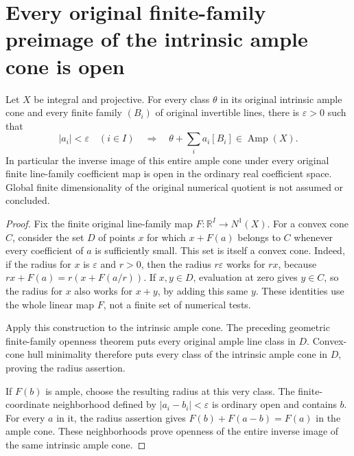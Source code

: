 \section{Every original finite-family preimage of the intrinsic ample cone is open}
\label{sec:native-numerical-ample-family-openness}

\begin{theorem}
\label{thm:native-numerical-ample-family-openness}
\leanok
{}
Let $X$ be integral and projective. For every class $\theta$ in its
original intrinsic ample cone and every finite family $(B_i)$ of
original invertible lines, there is $\varepsilon>0$ such that
\[
 |a_i|<\varepsilon\quad(i\in I)
 \quad\Longrightarrow\quad
 \theta+\sum_i a_i[B_i]\in\operatorname{Amp}(X).
\]
In particular the inverse image of this entire ample cone under every
original finite line-family coefficient map is open in the ordinary
real coefficient space. Global finite dimensionality of the original
numerical quotient is not assumed or concluded.
\end{theorem}
\begin{proof}
Fix the finite original line-family map $F:\mathbb R^I\to N^1(X)$.
For a convex cone $C$, consider the set $D$ of points $x$ for which
$x+F(a)$ belongs to $C$ whenever every coefficient of $a$ is sufficiently
small. This set is itself a convex cone. Indeed, if the radius for $x$
is $\varepsilon$ and $r>0$, then the radius $r\varepsilon$ works for
$rx$, because $rx+F(a)=r(x+F(a/r))$. If $x,y\in D$, evaluation at zero
gives $y\in C$, so the radius for $x$ also works for $x+y$, by adding
this same $y$. These identities use the whole linear map $F$, not a
finite set of numerical tests.

Apply this construction to the intrinsic ample cone. The preceding
geometric finite-family openness theorem puts every original ample
line class in $D$. Convex-cone hull minimality therefore puts every
class of the intrinsic ample cone in $D$, proving the radius assertion.

If $F(b)$ is ample, choose the resulting radius at this very class.
The finite-coordinate neighborhood defined by
$|a_i-b_i|<\varepsilon$ is ordinary open and contains $b$.
For every $a$ in it, the radius assertion gives
$F(b)+F(a-b)=F(a)$ in the ample cone. These neighborhoods prove
openness of the entire inverse image of the same intrinsic ample cone.
\end{proof}
